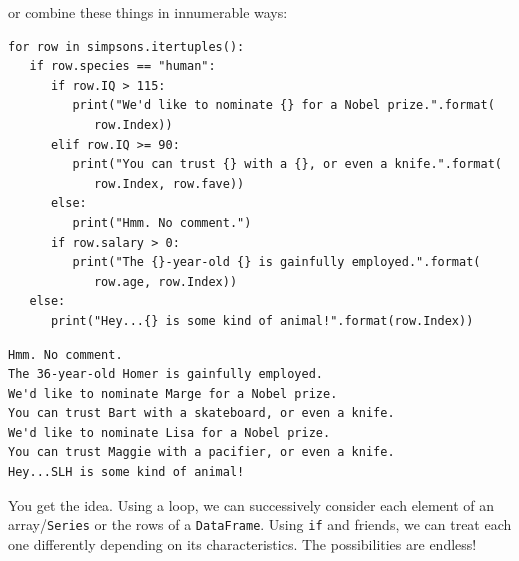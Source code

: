 or combine these things in innumerable ways:

\begin{Verbatim}[fontsize=\CBCodeSmall,samepage=true,frame=single,framesep=3mm]
for row in simpsons.itertuples():
   if row.species == "human":
      if row.IQ > 115:
         print("We'd like to nominate {} for a Nobel prize.".format(
            row.Index))
      elif row.IQ >= 90:
         print("You can trust {} with a {}, or even a knife.".format(
            row.Index, row.fave))
      else:
         print("Hmm. No comment.")
      if row.salary > 0:
         print("The {}-year-old {} is gainfully employed.".format(
            row.age, row.Index))
   else:
      print("Hey...{} is some kind of animal!".format(row.Index))
\end{Verbatim}
\vspace{-.2in}

\begin{Verbatim}[fontsize=\small,samepage=true,frame=leftline,framesep=5mm,framerule=1mm]
Hmm. No comment.
The 36-year-old Homer is gainfully employed.
We'd like to nominate Marge for a Nobel prize.
You can trust Bart with a skateboard, or even a knife.
We'd like to nominate Lisa for a Nobel prize.
You can trust Maggie with a pacifier, or even a knife.
Hey...SLH is some kind of animal!
\end{Verbatim}

You get the idea. Using a loop, we can successively consider each element of an
array/\texttt{Series} or the rows of a \texttt{DataFrame}. Using \texttt{if}
and friends, we can treat each one differently depending on its
characteristics. The possibilities are endless!
